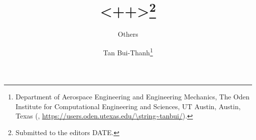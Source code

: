 

\usepackage{lipsum}
\usepackage{amsfonts,dsfont}
\usepackage{graphicx}
\usepackage{epstopdf}
\usepackage{algorithmic}
\ifpdf
\else
\fi

\newcommand{\creflastconjunction}{, and~}



\title{<++>\thanks{Submitted to the editors DATE.
}}

\author{Others
\and Tan Bui-Thanh\thanks{Department of Aerospace Engineering and
  Engineering Mechanics, The Oden Institute for Computational
  Engineering and Sciences, UT Austin,  Austin, Texas
  (,
  \url{https://users.oden.utexas.edu/\string~tanbui/}).}
}
\usepackage{amsopn}
\DeclareMathOperator{\diag}{diag}


\makeatletter
\newcommand*{\addFileDependency}[1]{%
  \typeout{(#1)}%
  \@addtofilelist{#1}%
  \IfFileExists{#1}{}{\typeout{No file #1.}}%
}
\makeatother

\newcommand*{\myexternaldocument}[1]{%
    \addFileDependency{#1.tex}%
    \addFileDependency{#1.aux}%
}

\newcommand{\mynote}[3]{
	\textcolor{#2}{\fbox{\bfseries\sffamily\scriptsize#1}}
		{\textsf{\emph{#3}}}
}

